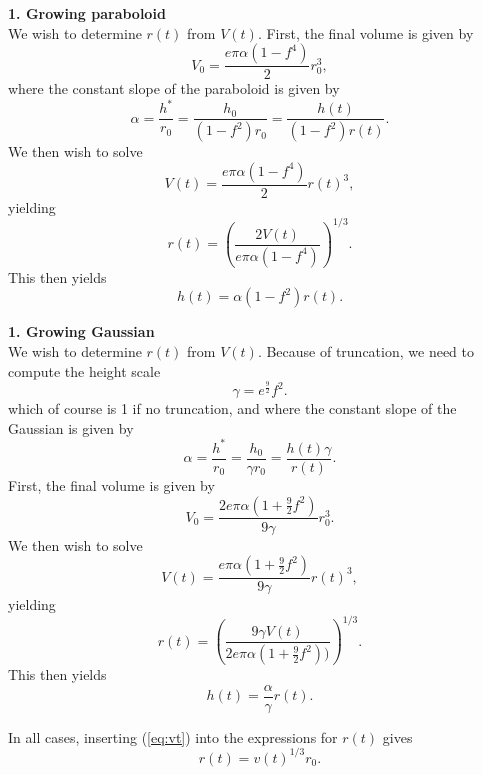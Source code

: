 \documentclass[12pt]{article}
\begin{document}
{\center \bf 1. Growing paraboloid}\\

We wish to determine $r(t)$ from $V(t)$.  First, the final volume is given by
\begin{equation}
V_0 = \frac{e \pi \alpha (1 - f^4)}{2}r_0^3,
\end{equation}
where the constant slope of the paraboloid is given by
\begin{equation}
\alpha = \frac{h^*}{r_0} = \frac{h_0}{(1-f^2)r_0} = \frac{h(t)}{(1-f^2)r(t)}.
\end{equation}
We then wish to solve
\begin{equation}
V(t) = \frac{e \pi \alpha (1 - f^4)}{2}r(t)^3,
\end{equation}
yielding
\begin{equation}
r(t) = \left ( \frac{2 V(t)}{e \pi \alpha (1 - f^4)} \right)^{1/3}.
\end{equation}
This then yields
\begin{equation}
h(t) = \alpha (1 - f^2) r(t).
\end{equation}


{\center \bf 1. Growing Gaussian}\\

We wish to determine $r(t)$ from $V(t)$.  Because of truncation, we need to compute the height scale
\begin{equation}
\gamma = e^\frac{9}{2}f^2.
\end{equation}
which of course is 1 if no truncation, and
where the constant slope of the Gaussian is given by
\begin{equation}
\alpha = \frac{h^*}{r_0} = \frac{h_0}{\gamma r_0} = \frac{h(t) \gamma}{r(t)}.
\end{equation}
First, the final volume is given by
\begin{equation}
V_0 = \frac{2 e \pi \alpha (1 + \frac{9}{2}f^2)}{9\gamma}r_0^3.
\end{equation}
We then wish to solve
\begin{equation}
V(t) = \frac{e \pi \alpha (1 + \frac{9}{2}f^2)}{9\gamma}r(t)^3,
\end{equation}
yielding
\begin{equation}
r(t) = \left ( \frac{9 \gamma V(t)}{2 e \pi \alpha (1 + \frac{9}{2}f^2))} \right)^{1/3}.
\end{equation}
This then yields
\begin{equation}
h(t) = \frac{\alpha}{\gamma} r(t).
\end{equation}


In all cases, inserting (\ref{eq:vt}) into the expressions for $r(t)$ gives
\begin{equation}
r(t) = v(t)^{1/3} r_0.
\end{equation}
\end{document}
